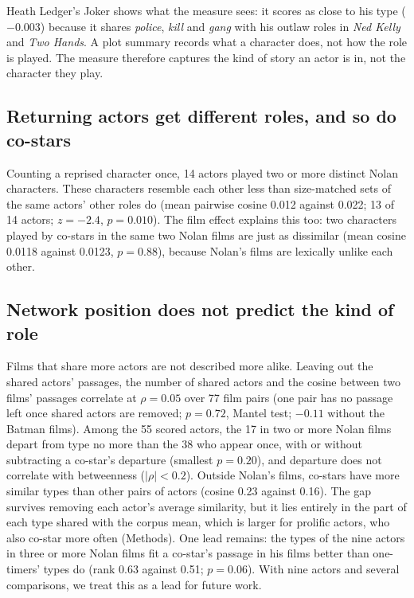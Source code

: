\documentclass[9pt,twocolumn,twoside]{pnas-new}
\begin{document}
Heath Ledger's Joker shows what the measure sees: it scores as close to his type ($-0.003$) because it shares \emph{police}, \emph{kill} and \emph{gang} with his outlaw roles in \emph{Ned Kelly} and \emph{Two Hands}. A plot summary records what a character does, not how the role is played. The measure therefore captures the kind of story an actor is in, not the character they play.

\subsection*{Returning actors get different roles, and so do co-stars}
Counting a reprised character once, 14 actors played two or more distinct Nolan characters. These characters resemble each other less than size-matched sets of the same actors' other roles do (mean pairwise cosine 0.012 against 0.022; 13 of 14 actors; $z = -2.4$, $p = 0.010$). The film effect explains this too: two characters played by co-stars in the same two Nolan films are just as dissimilar (mean cosine 0.0118 against 0.0123, $p = 0.88$), because Nolan's films are lexically unlike each other.

\subsection*{Network position does not predict the kind of role}
Films that share more actors are not described more alike. Leaving out the shared actors' passages, the number of shared actors and the cosine between two films' passages correlate at $\rho = 0.05$ over 77 film pairs (one pair has no passage left once shared actors are removed; $p = 0.72$, Mantel test; $-0.11$ without the Batman films). Among the 55 scored actors, the 17 in two or more Nolan films depart from type no more than the 38 who appear once, with or without subtracting a co-star's departure (smallest $p = 0.20$), and departure does not correlate with betweenness ($|\rho| < 0.2$). Outside Nolan's films, co-stars have more similar types than other pairs of actors (cosine 0.23 against 0.16). The gap survives removing each actor's average similarity, but it lies entirely in the part of each type shared with the corpus mean, which is larger for prolific actors, who also co-star more often (Methods). One lead remains: the types of the nine actors in three or more Nolan films fit a co-star's passage in his films better than one-timers' types do (rank 0.63 against 0.51; $p = 0.06$). With nine actors and several comparisons, we treat this as a lead for future work.
\end{document}
